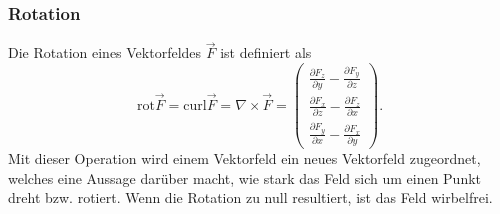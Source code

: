 \subsubsection{Rotation}
Die Rotation eines Vektorfeldes $\vec{F}$ ist definiert als
\[
\renewcommand{\arraystretch}{1.9} 
\text{rot}\vec{F} = 
\text{curl}\vec{F}
=\nabla\times\vec{F}
= \begin{pmatrix}
	\displaystyle
	\frac{\partial F_z}{\partial y} -\frac{\partial F_y}{\partial z}\\
	\displaystyle
	\frac{\partial F_x}{\partial z} -\frac{\partial F_z}{\partial x}\\
	\displaystyle
	\frac{\partial F_y}{\partial x} -\frac{\partial F_x}{\partial y}
\end{pmatrix}
. \]
Mit dieser Operation wird einem Vektorfeld ein neues Vektorfeld zugeordnet, welches eine Aussage darüber macht, wie stark das Feld sich um einen Punkt dreht bzw. rotiert.
Wenn die Rotation zu null resultiert, ist das Feld wirbelfrei.
